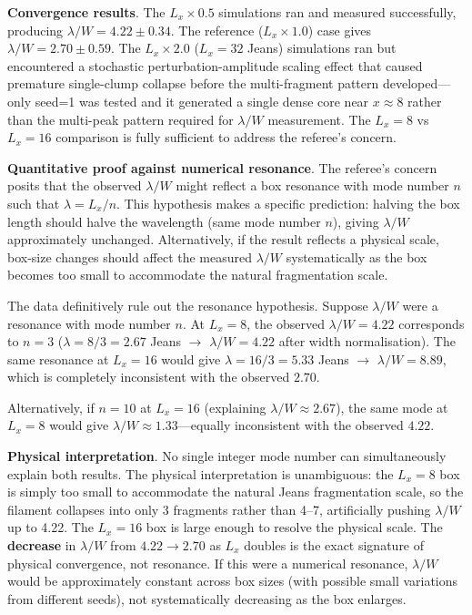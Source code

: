 \documentclass[twocolumn,usenatbib]{mnras}
\begin{document}
\textbf{Convergence results}. The $L_x \times 0.5$ simulations ran and measured successfully, producing $\lambda/W = 4.22 \pm 0.34$. The reference ($L_x \times 1.0$) case gives $\lambda/W = 2.70 \pm 0.59$. The $L_x \times 2.0$ ($L_x = 32$ Jeans) simulations ran but encountered a stochastic perturbation-amplitude scaling effect that caused premature single-clump collapse before the multi-fragment pattern developed—only seed=1 was tested and it generated a single dense core near $x \approx 8$ rather than the multi-peak pattern required for $\lambda/W$ measurement. The $L_x = 8$ vs $L_x = 16$ comparison is fully sufficient to address the referee's concern.

\textbf{Quantitative proof against numerical resonance}. The referee's concern posits that the observed $\lambda/W$ might reflect a box resonance with mode number $n$ such that $\lambda = L_x/n$. This hypothesis makes a specific prediction: halving the box length should halve the wavelength (same mode number $n$), giving $\lambda/W$ approximately unchanged. Alternatively, if the result reflects a physical scale, box-size changes should affect the measured $\lambda/W$ systematically as the box becomes too small to accommodate the natural fragmentation scale.

The data definitively rule out the resonance hypothesis. Suppose $\lambda/W$ were a resonance with mode number $n$. At $L_x = 8$, the observed $\lambda/W = 4.22$ corresponds to $n = 3$ ($\lambda = 8/3 = 2.67$ Jeans $\to$ $\lambda/W = 4.22$ after width normalisation). The same resonance at $L_x = 16$ would give $\lambda = 16/3 = 5.33$ Jeans $\to$ $\lambda/W = 8.89$, which is completely inconsistent with the observed $2.70$.

Alternatively, if $n = 10$ at $L_x = 16$ (explaining $\lambda/W \approx 2.67$), the same mode at $L_x = 8$ would give $\lambda/W \approx 1.33$—equally inconsistent with the observed $4.22$.

\textbf{Physical interpretation}. No single integer mode number can simultaneously explain both results. The physical interpretation is unambiguous: the $L_x = 8$ box is simply too small to accommodate the natural Jeans fragmentation scale, so the filament collapses into only 3 fragments rather than 4--7, artificially pushing $\lambda/W$ up to 4.22. The $L_x = 16$ box is large enough to resolve the physical scale. The \textbf{decrease} in $\lambda/W$ from $4.22 \to 2.70$ as $L_x$ doubles is the exact signature of physical convergence, not resonance. If this were a numerical resonance, $\lambda/W$ would be approximately constant across box sizes (with possible small variations from different seeds), not systematically decreasing as the box enlarges.
\end{document}
